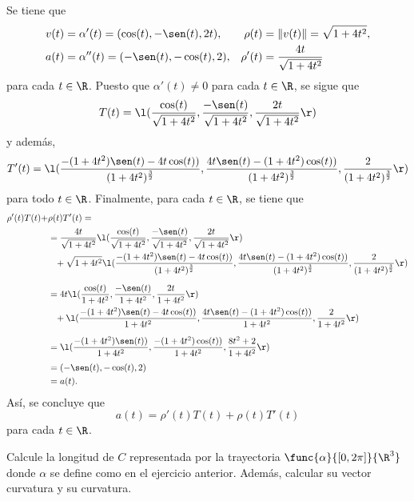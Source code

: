 \documentclass[a4,11pt]{aleph-examen}
\begin{document}
\begin{preguntas}
\begin{respuesta}
	Se tiene que
	\begin{align*}
        v(t)
        &=\alpha'(t)=(\cos(t),-\sen(t),2t),
        &\rho(t)&=\|v(t)\|=\sqrt{1+4t^2},\\
        a(t)&=\alpha''(t)=(-\sen(t),-\cos(t),2),
        &\rho'(t)&=\dfrac{4t}{\sqrt{1+4t^2}}
	\end{align*}
	para cada $t\in\R$. Puesto que $\alpha'(t)\neq0$ para cada $t\in\R$, se sigue que
	\begin{align*}
		T(t)=\l(\dfrac{\cos(t)}{\sqrt{1+4t^2}},\dfrac{-\sen(t)}{\sqrt{1+4t^2}},\dfrac{2t}{\sqrt{1+4t^2}}\r)
	\end{align*}
	y además, 
	\[
		T'(t)
		=\l(\dfrac{-(1+4t^2) \sen(t) -4t\cos(t))}{(1 + 4 t^2)^\frac{3}{2}},
		\dfrac{ 4t\sen(t)-(1+4t^2) \cos(t))}{(1 + 4 t^2)^\frac{3}{2}},
		\dfrac{ 2}{(1 + 4 t^2)^\frac{3}{2}}\r)
	\]
	para todo $t\in\R$. Finalmente, para cada $t\in\R$, se tiene que
	\begin{align*}
		\rho'(t) T(t)+&\rho(t) T' (t)=\\
		&= \dfrac{4t}{\sqrt{1+4t^2}}\l(\dfrac{\cos(t)}{\sqrt{1+4t^2}},\dfrac{-\sen(t)}{\sqrt{1+4t^2}},\dfrac{2t}{\sqrt{1+4t^2}}\r)\\
	    &\phantom{=}+\sqrt{1+4t^2}\l(\dfrac{-(1+4t^2) \sen(t) -4t\cos(t))}{(1 + 4t^2)^\frac{3}{2}},
			\dfrac{ 4t\sen(t)-(1+4t^2) \cos(t))}{(1 + 4 t^2)^\frac{3}{2}},
			\dfrac{ 2}{(1 + 4 t^2)^\frac{3}{2}}\r)\\[2mm]
		&= 4t\l(\dfrac{\cos(t)}{1+4t^2},\dfrac{-\sen(t)}{1+4t^2},\dfrac{2t}{1+4t^2}\r)\\
		&\phantom{=}+\l(\dfrac{-(1+4t^2) \sen(t) -4t\cos(t))}{1 + 4t^2},
			\dfrac{ 4t\sen(t)-(1+4t^2) \cos(t))}{1 + 4t^2},
			\dfrac{ 2}{1 + 4t^2}\r)\\[2mm]
		&=\l(\dfrac{-(1+4t^2) \sen(t))}{1 + 4t^2},
			\dfrac{-(1+4t^2) \cos(t))}{1 + 4t^2},
			\dfrac{8t^2+2}{1 + 4t^2}\r)\\[1mm]
		&=(-\sen(t),-\cos(t),2)\\
		&=a(t).
	\end{align*}
	Así, se concluye que
	\[
		a(t)=\rho'(t) T(t)+\rho(t) T' (t)
	\]
	para cada $t\in\R$.
\end{respuesta}

\item 
	Calcule la longitud de $C$ representada por la trayectoria $\func{\alpha}{[0,2\pi]}{\R^3}$ donde $\alpha$ se define como en el ejercicio anterior. Además, calcular su vector curvatura y su curvatura.


\end{preguntas}
\end{document}
